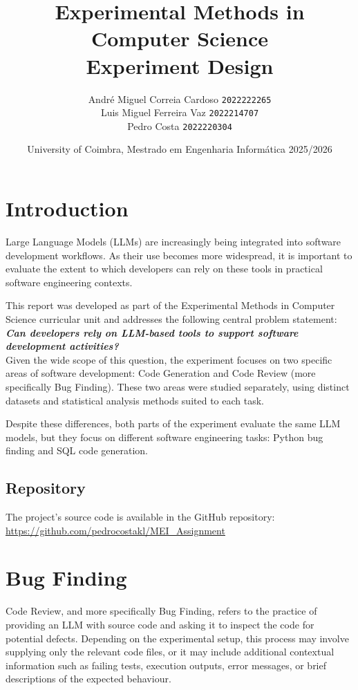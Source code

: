 \documentclass[11pt,a4paper]{article}
\title{
    \textbf {Experimental Methods in Computer Science}\\
    \large \textbf {Experiment Design}
    }
\author{
    \begin{tabular}{c}
    André Miguel Correia Cardoso
    \texttt{2022222265}\\
    Luis Miguel Ferreira Vaz 
    \texttt{2022214707}\\
    Pedro Costa 
    \texttt{2022220304}\\
    \end{tabular}
    }
\date{University of Coimbra, Mestrado em Engenharia Informática 2025/2026}
\begin{document}
    \maketitle

    \newpage
    \tableofcontents
    \newpage

    \section{Introduction}
    Large Language Models (LLMs) are increasingly being integrated into software development workflows. As their use becomes more widespread, it is important to evaluate the extent to which developers can rely on these tools in practical software engineering contexts.

    This report was developed as part of the Experimental Methods in Computer Science curricular unit and addresses the following central problem statement:\\

    \textbf{\textit{Can developers rely on LLM-based tools to support software development activities?}}\\

    Given the wide scope of this question, the experiment focuses on two specific areas of software development: Code Generation and Code Review (more specifically Bug Finding). These two areas were studied separately, using distinct datasets and statistical analysis methods suited to each task.

    Despite these differences, both parts of the experiment evaluate the same LLM models, but they focus on different software engineering tasks: Python bug finding and SQL code generation.

    \subsection{Repository}
    The project's source code is available in the GitHub repository:\\
    \url{https://github.com/pedrocostakl/MEI_Assignment}
    \newpage{}


    \section{Bug Finding}
    Code Review, and more specifically Bug Finding, refers to the practice of providing an LLM with source code and asking it to inspect the code for potential defects. Depending on the experimental setup, this process may involve supplying only the relevant code files, or it may include additional contextual information such as failing tests, execution outputs, error messages, or brief descriptions of the expected behaviour.
\end{document}
